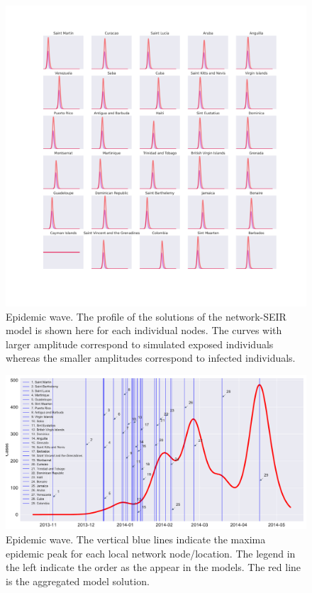 \documentclass[11pt]{article}
\begin{document}
\begin{figure}[ht]
\centering
\includegraphics[scale=.06]{./wave}
\caption{\small Epidemic wave. The profile of the solutions of the network-SEIR model is shown here for each individual nodes. The curves with larger amplitude correspond to simulated exposed individuals whereas the smaller amplitudes correspond to infected individuals.}
\label{fig:wave}
\end{figure}


\vspace{4cm}

\begin{figure}[ht]
\centering
\includegraphics[scale=.38]{./wave4}
\caption{\small Epidemic wave. The vertical blue lines indicate the maxima epidemic peak for each local network node/location. The legend in the left indicate the order as the appear in the models. The red line is the aggregated model solution.}
\label{fig:wave}
\end{figure}
\end{document}
